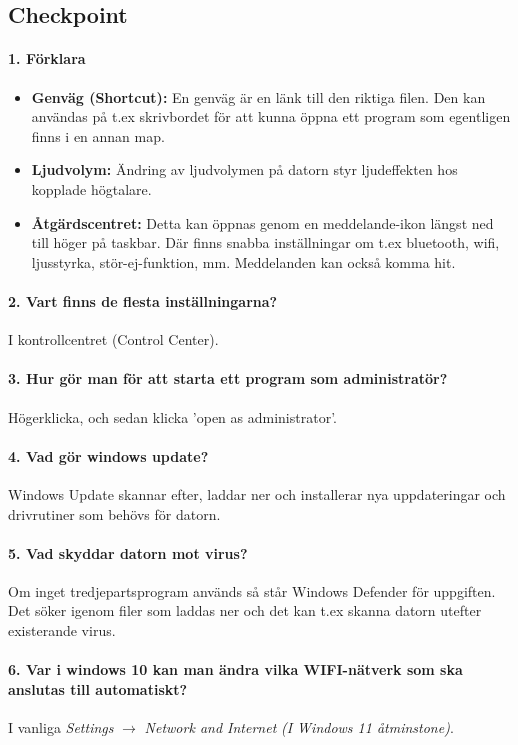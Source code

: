 \subsection{Checkpoint}

\paragraph{1. Förklara}
\begin{itemize}
	\item \textbf{Genväg (Shortcut):} En genväg är en länk till den riktiga filen. Den kan användas på t.ex skrivbordet för att kunna öppna ett program som egentligen finns i en annan map.
	\item \textbf{Ljudvolym:} Ändring av ljudvolymen på datorn styr ljudeffekten hos kopplade högtalare.
	\item \textbf{Åtgärdscentret:} Detta kan öppnas genom en meddelande-ikon längst ned till höger på taskbar. Där finns snabba inställningar om t.ex bluetooth, wifi, ljusstyrka, stör-ej-funktion, mm. Meddelanden kan också komma hit.
\end{itemize} 

\paragraph{2. Vart finns de flesta inställningarna?}
I kontrollcentret (Control Center).

\paragraph{3. Hur gör man för att starta ett program som administratör?}
Högerklicka, och sedan klicka 'open as administrator'.

\paragraph{4. Vad gör windows update?}
Windows Update skannar efter, laddar ner och installerar nya uppdateringar och drivrutiner som behövs för datorn.

\paragraph{5. Vad skyddar datorn mot virus?}
Om inget tredjepartsprogram används så står Windows Defender för uppgiften. Det söker igenom filer som laddas ner och det kan t.ex skanna datorn utefter existerande virus.

\paragraph{6. Var i windows 10 kan man ändra vilka WIFI-nätverk som ska anslutas till automatiskt?}
I vanliga \textit{Settings} $\rightarrow$ \textit{Network and Internet} \textit{(I Windows 11 åtminstone)}.

